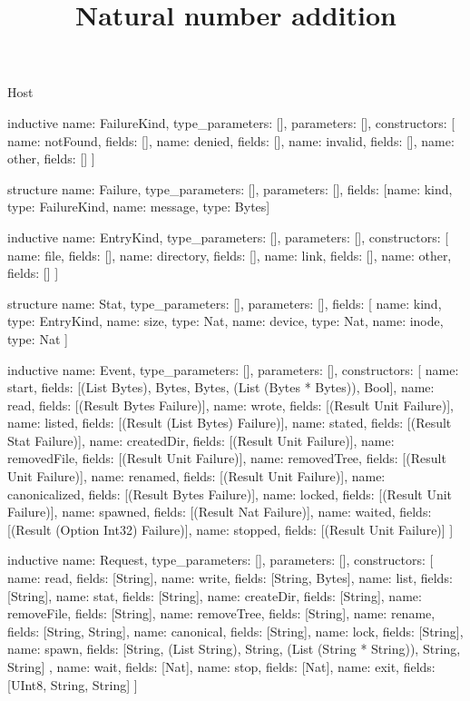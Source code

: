 \begin{lexlean}{Host}
\title{Natural number addition}
\begin{semanticmodule}
inductive{
  name: FailureKind,
  type_parameters: [],
  parameters: [],
  constructors: [
    {name: notFound, fields: []},
    {name: denied, fields: []},
    {name: invalid, fields: []},
    {name: other, fields: []}
  ]
}

structure{
  name: Failure,
  type_parameters: [],
  parameters: [],
  fields: [{name: kind, type: FailureKind}, {name: message, type: Bytes}]
}

inductive{
  name: EntryKind,
  type_parameters: [],
  parameters: [],
  constructors: [
    {name: file, fields: []},
    {name: directory, fields: []},
    {name: link, fields: []},
    {name: other, fields: []}
  ]
}

structure{
  name: Stat,
  type_parameters: [],
  parameters: [],
  fields: [
    {name: kind, type: EntryKind},
    {name: size, type: Nat},
    {name: device, type: Nat},
    {name: inode, type: Nat}
  ]
}

inductive{
  name: Event,
  type_parameters: [],
  parameters: [],
  constructors: [
    {name: start, fields: [(List Bytes), Bytes, Bytes, (List (Bytes * Bytes)), Bool]},
    {name: read, fields: [(Result Bytes Failure)]},
    {name: wrote, fields: [(Result Unit Failure)]},
    {name: listed, fields: [(Result (List Bytes) Failure)]},
    {name: stated, fields: [(Result Stat Failure)]},
    {name: createdDir, fields: [(Result Unit Failure)]},
    {name: removedFile, fields: [(Result Unit Failure)]},
    {name: removedTree, fields: [(Result Unit Failure)]},
    {name: renamed, fields: [(Result Unit Failure)]},
    {name: canonicalized, fields: [(Result Bytes Failure)]},
    {name: locked, fields: [(Result Unit Failure)]},
    {name: spawned, fields: [(Result Nat Failure)]},
    {name: waited, fields: [(Result (Option Int32) Failure)]},
    {name: stopped, fields: [(Result Unit Failure)]}
  ]
}

inductive{
  name: Request,
  type_parameters: [],
  parameters: [],
  constructors: [
    {name: read, fields: [String]},
    {name: write, fields: [String, Bytes]},
    {name: list, fields: [String]},
    {name: stat, fields: [String]},
    {name: createDir, fields: [String]},
    {name: removeFile, fields: [String]},
    {name: removeTree, fields: [String]},
    {name: rename, fields: [String, String]},
    {name: canonical, fields: [String]},
    {name: lock, fields: [String]},
    {
      name: spawn,
      fields: [String, (List String), String, (List (String * String)), String, String]
    },
    {name: wait, fields: [Nat]},
    {name: stop, fields: [Nat]},
    {name: exit, fields: [UInt8, String, String]}
  ]
}
\end{semanticmodule}
\end{lexlean}
